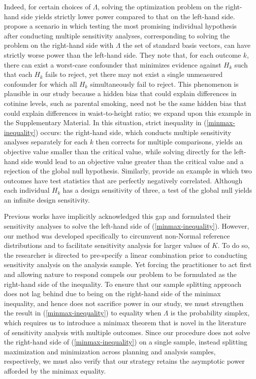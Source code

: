 \documentclass[12pt,leqno,titlepage]{amsart}
\newcommand{\1}{\mathbbm{1}}
\begin{document}
\begin{bibunit}
Indeed, for certain choices of $\Lambda$, solving the optimization problem on the right-hand side yields strictly lower power compared to that on the left-hand side. \cite[\S 3.2]{fogarty2016sensitivity} propose a scenario in which testing the most promising individual hypothesis after conducting multiple sensitivity analyses, corresponding to solving the problem on the right-hand side with $\Lambda$ the set of standard basis vectors, can have strictly worse power than the left-hand side. They note that, for each outcome $k$, there can exist a worst-case confounder that minimizes evidence against $H_k$ such that each $H_k$ fails to reject, yet there may not exist a single unmeasured confounder for which all $H_k$ simultaneously fail to reject. This phenomenon is plausible in our study because a hidden bias that could explain differences in cotinine levels, such as parental smoking, need not be the same hidden bias that could explain differences in waist-to-height ratio; we expand upon this example in the Supplementary Material.
In this situation, strict inequality in (\ref{minmax-inequality}) occurs: the right-hand side, which conducts multiple sensitivity analyses separately for each $k$ then corrects for multiple comparisons, yields an objective value smaller than the critical value, while solving directly for the left-hand side would lead to an objective value greater than the critical value and a rejection of the global null hypothesis. Similarly, \cite{heng2021increasing} provide an example in which two outcomes have test statistics that are perfectly negatively correlated. Although each individual $H_k$ has a design sensitivity of three, a test of the global null yields an infinite design sensitivity.%

Previous works have implicitly acknowledged this gap and formulated their sensitivity analyses  to solve the left-hand side of (\ref{minmax-inequality}). However, our method was developed specifically to circumvent non-Normal reference distributions and to facilitate sensitivity analysis for larger values of $K$. To do so, the researcher is directed to pre-specify a linear combination prior to conducting sensitivity analysis on the analysis sample. Yet forcing the practitioner to act first and allowing nature to respond compels our problem to be formulated as the right-hand side of the inequality. To ensure that our sample splitting approach does not lag behind due to being on the right-hand side of the minimax inequality, and hence does not sacrifice power in our study,
we must strengthen the result in (\ref{minmax-inequality}) to equality when $\Lambda$ is the probability simplex, which requires us to introduce a minimax theorem that is novel in the literature of sensitivity analysis with multiple outcomes. Since our procedure does not solve the right-hand side of (\ref{minmax-inequality}) on a single sample, instead splitting maximization and minimization across planning and analysis samples, respectively, we must also verify that our strategy retains the asymptotic power afforded by the minimax equality.



\end{bibunit}
\end{document}

